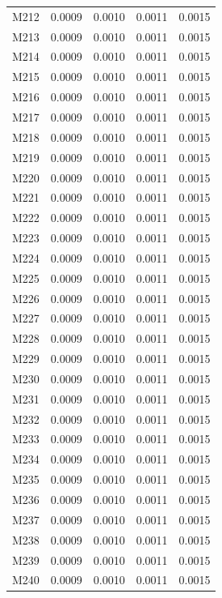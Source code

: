\begin{longtable}{lrrrr}
M212 & 0.0009 & 0.0010 & 0.0011 & 0.0015 \\
M213 & 0.0009 & 0.0010 & 0.0011 & 0.0015 \\
M214 & 0.0009 & 0.0010 & 0.0011 & 0.0015 \\
M215 & 0.0009 & 0.0010 & 0.0011 & 0.0015 \\
M216 & 0.0009 & 0.0010 & 0.0011 & 0.0015 \\
M217 & 0.0009 & 0.0010 & 0.0011 & 0.0015 \\
M218 & 0.0009 & 0.0010 & 0.0011 & 0.0015 \\
M219 & 0.0009 & 0.0010 & 0.0011 & 0.0015 \\
M220 & 0.0009 & 0.0010 & 0.0011 & 0.0015 \\
M221 & 0.0009 & 0.0010 & 0.0011 & 0.0015 \\
M222 & 0.0009 & 0.0010 & 0.0011 & 0.0015 \\
M223 & 0.0009 & 0.0010 & 0.0011 & 0.0015 \\
M224 & 0.0009 & 0.0010 & 0.0011 & 0.0015 \\
M225 & 0.0009 & 0.0010 & 0.0011 & 0.0015 \\
M226 & 0.0009 & 0.0010 & 0.0011 & 0.0015 \\
M227 & 0.0009 & 0.0010 & 0.0011 & 0.0015 \\
M228 & 0.0009 & 0.0010 & 0.0011 & 0.0015 \\
M229 & 0.0009 & 0.0010 & 0.0011 & 0.0015 \\
M230 & 0.0009 & 0.0010 & 0.0011 & 0.0015 \\
M231 & 0.0009 & 0.0010 & 0.0011 & 0.0015 \\
M232 & 0.0009 & 0.0010 & 0.0011 & 0.0015 \\
M233 & 0.0009 & 0.0010 & 0.0011 & 0.0015 \\
M234 & 0.0009 & 0.0010 & 0.0011 & 0.0015 \\
M235 & 0.0009 & 0.0010 & 0.0011 & 0.0015 \\
M236 & 0.0009 & 0.0010 & 0.0011 & 0.0015 \\
M237 & 0.0009 & 0.0010 & 0.0011 & 0.0015 \\
M238 & 0.0009 & 0.0010 & 0.0011 & 0.0015 \\
M239 & 0.0009 & 0.0010 & 0.0011 & 0.0015 \\
M240 & 0.0009 & 0.0010 & 0.0011 & 0.0015 \\
\end{longtable}
